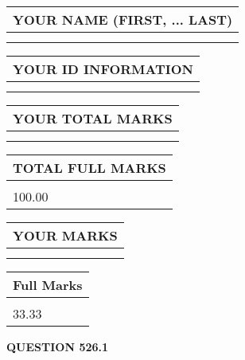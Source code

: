 \documentclass{ctexart}
\begin{document}
   
   
   
\newpage 
\setcounter{page}{ 
   526001 } 
   
   
   
   
\noindent\begin{tabular}{|l|}
\hline
YOUR NAME (FIRST, ... LAST)  \\
\hline
 \\ 
 \\ 
\hline
\end{tabular}
\hspace{0.05in} \begin{tabular}{|l|}
\hline
 YOUR   ID   INFORMATION  \\
\hline
 \\ 
 \\ 
\hline
\end{tabular}
   
   
\vspace{0.2in}\noindent\begin{tabular}{|l|}
\hline
YOUR TOTAL MARKS  \\
\hline
 \\ 
 \\ 
\hline
\end{tabular}
\hspace{0.05in} \begin{tabular}{|l|}
\hline
TOTAL FULL MARKS  \\
\hline
 \\ 
100.00 \\
\hline
\end{tabular}
   
   
 \vspace{0.2in}
 
 
 
 
   
   
  
\vspace{0.2in}
  
\noindent\begin{tabular}{|l|}
\hline
 YOUR MARKS  \\
\hline
 \\ 
 \\ 
\hline
\end{tabular}
\hspace{0.05in} \begin{tabular}{|l|}
\hline
 Full Marks  \\
\hline
 \\ 
33.33 \\
\hline
\end{tabular}
{\textbf{\Large{QUESTION
526.1 
}}}
  
\end{document}
